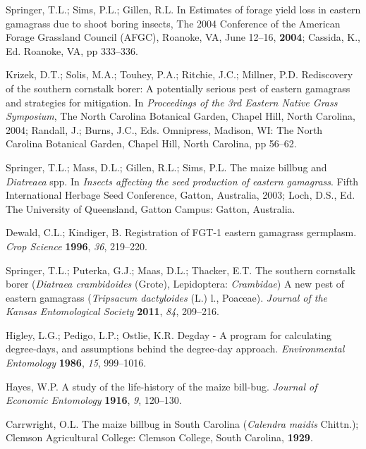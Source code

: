\documentclass[agronomy,article,submit,moreauthors,pdftex,10pt,a4paper]{mdpi}
\theoremstyle{mdpi}
\newcounter{ex}
\newcounter{re}
\theoremstyle{mdpidefinition}
\begin{document}
\begin{thebibliography}{999}
Springer, T.L.; Sims, P.L.; Gillen, R.L. In Estimates of forage yield loss in eastern gamagrass due to shoot boring insects, The 2004 Conference of the American Forage Grassland Council (AFGC), Roanoke, VA, June 12–16, \textbf{2004}; Cassida, K., Ed. Roanoke, VA, pp 333–336.

Krizek, D.T.; Solis, M.A.; Touhey, P.A.; Ritchie, J.C.; Millner, P.D. Rediscovery of the southern cornstalk borer: A potentially serious pest of eastern gamagrass and strategies for mitigation. In \textit{Proceedings of the 3rd Eastern Native Grass Symposium}, The North Carolina Botanical Garden, Chapel Hill, North Carolina, 2004; Randall, J.; Burns, J.C., Eds. Omnipress, Madison, WI: The North Carolina Botanical Garden, Chapel Hill, North Carolina, pp 56–62.

Springer, T.L.; Mass, D.L.; Gillen, R.L.; Sims, P.L. The maize billbug and \textit{Diatreaea }spp. In \textit{Insects affecting the seed production of eastern gamagrass}. Fifth International Herbage Seed Conference, Gatton, Australia, 2003; Loch, D.S., Ed. The University of Queensland, Gatton Campus: Gatton, Australia.

Dewald, C.L.; Kindiger, B. Registration of FGT-1 eastern gamagrass germplasm. \textit{Crop Science} \textbf{1996}, \textit{36}, 219–220.

Springer, T.L.; Puterka, G.J.; Maas, D.L.; Thacker, E.T. The southern cornstalk borer (\textit{Diatraea crambidoides }(Grote), Lepidoptera: \textit{Crambidae}) A new pest of eastern gamagrass (\textit{Tripsacum dactyloides} (L.) l., Poaceae). \textit{Journal of the Kansas Entomological Society} \textbf{2011}, \textit{84}, 209–216.

Higley, L.G.; Pedigo, L.P.; Ostlie, K.R. Degday - A program for calculating degree-days, and assumptions behind the degree-day approach. \textit{Environmental Entomology} \textbf{1986}, \textit{15}, 999–1016.

Hayes, W.P. A study of the life-history of the maize bill-bug. \textit{Journal of Economic Entomology} \textbf{1916}, \textit{9}, 120–130.

Carrwright, O.L. The maize billbug in South Carolina (\textit{Calendra maidis} Chittn.); Clemson Agricultural College: Clemson College, South Carolina, \textbf{1929}.


\end{thebibliography}
\end{document}
